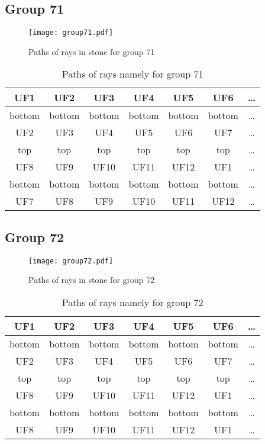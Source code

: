 \subsection*{Group 71}






\begin{figure}[h!]
\centering
\texttt{[image: group71.pdf]}
\caption{Paths of rays in stone for group 71}
\label{table:FigGroup71}
\end{figure}



\begin{table}[h!]
\centering
\begin{tabular}{|c|c|c|c|c|c|c|}
\hline
UF1 & UF2 & UF3 & UF4 & UF5 & UF6 & \dots \\
\hline
bottom & bottom & bottom & bottom & bottom & bottom & \dots \\
\hline
UF2 & UF3 & UF4 & UF5 & UF6 & UF7 & \dots \\
\hline
top & top & top & top & top & top & \dots \\
\hline
UF8 & UF9 & UF10 & UF11 & UF12 & UF1 & \dots \\
\hline
bottom & bottom & bottom & bottom & bottom & bottom & \dots \\
\hline
UF7 & UF8 & UF9 & UF10 & UF11 & UF12 & \dots \\
\hline
\end{tabular}
\caption{Paths of rays namely for group 71}
\label{table:TableGroup71}
\end{table}
\newpage
\subsection*{Group 72}






\begin{figure}[h!]
\centering
\texttt{[image: group72.pdf]}
\caption{Paths of rays in stone for group 72}
\label{table:FigGroup72}
\end{figure}



\begin{table}[h!]
\centering
\begin{tabular}{|c|c|c|c|c|c|c|}
\hline
UF1 & UF2 & UF3 & UF4 & UF5 & UF6 & \dots \\
\hline
bottom & bottom & bottom & bottom & bottom & bottom & \dots \\
\hline
UF2 & UF3 & UF4 & UF5 & UF6 & UF7 & \dots \\
\hline
top & top & top & top & top & top & \dots \\
\hline
UF8 & UF9 & UF10 & UF11 & UF12 & UF1 & \dots \\
\hline
bottom & bottom & bottom & bottom & bottom & bottom & \dots \\
\hline
UF8 & UF9 & UF10 & UF11 & UF12 & UF1 & \dots \\
\hline
\end{tabular}
\caption{Paths of rays namely for group 72}
\label{table:TableGroup72}
\end{table}
\newpage
